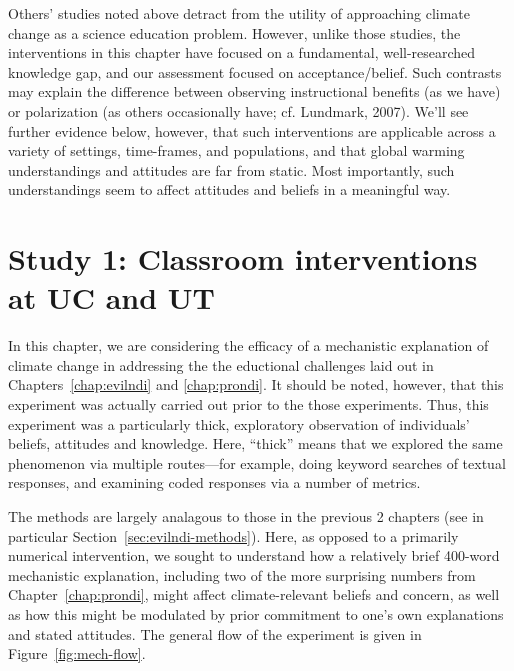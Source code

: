Others’ studies noted above detract from the utility of approaching climate
change as a science education problem. However, unlike those studies, the
interventions in this chapter have focused on a fundamental, well-researched
knowledge gap, and our assessment focused on acceptance/belief. Such contrasts
may explain the difference between observing instructional benefits (as we have)
or polarization (as others occasionally have; cf. Lundmark, 2007). We'll see
further evidence below, however, that such interventions are applicable across a
variety of settings, time-frames, and populations, and that global warming
understandings and attitudes are far from static. Most importantly, such
understandings seem to affect attitudes and beliefs in a meaningful way.


\section{Study 1: Classroom interventions at UC and UT}
\label{sec:mech-classroom}

In this chapter, we are considering the efficacy of a mechanistic explanation of
climate change in addressing the the eductional challenges laid out in
Chapters~\ref{chap:evilndi} and \ref{chap:prondi}. It should be noted, however,
that this experiment was actually carried out prior to the those experiments.
Thus, this experiment was a particularly thick, exploratory observation of
individuals' beliefs, attitudes and knowledge. Here, “thick” means that we
explored the same phenomenon via multiple routes---for example, doing keyword
searches of textual responses, and examining coded responses via a number of
metrics. 

The methods are largely analagous to those in the previous 2 chapters (see in
particular Section~\ref{sec:evilndi-methods}). Here, as opposed to a primarily
numerical intervention, we sought to understand how a
relatively brief 400-word mechanistic explanation, including two of the more
surprising numbers from Chapter~\ref{chap:prondi}, might affect climate-relevant
beliefs and concern,
as well as how this might be modulated by prior commitment to one's own
explanations and stated attitudes.  The general flow of the experiment is given
in Figure~\ref{fig:mech-flow}.

